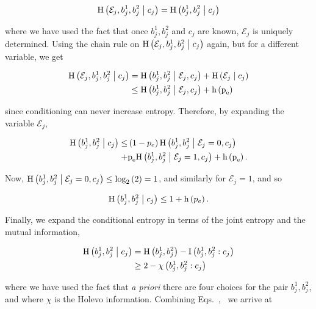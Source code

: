 \begin{equation*}
\text{H}\left(\mathcal{E}_j, b_j^1, b_j^2 \; \middle| \; c_j\right) = \text{H}\left(b_j^1, b_j^2 \; \middle| \; c_j\right)
\end{equation*}

\noindent where we have used the fact that once $b_j^1, b_j^2$ and $c_j$ are known, $\mathcal{E}_j$ is uniquely determined. Using the chain rule on $\text{H}\left(\mathcal{E}_j, b_j^1, b_j^2 \; \middle| \; c_j\right)$ again, but for a different variable, we get

\begin{align*}
\text{H}\left(\mathcal{E}_j, b_j^1, b_j^2 \; \middle| \; c_j\right) &= \text{H}\left(b_j^1, b_j^2 \; \middle| \; \mathcal{E}_j, c_j\right) + \text{H}\left(\mathcal{E}_j \; \middle| \; c_j\right) \notag \\
&\le \text{H}\left(b_j^1, b_j^2 \; \middle| \; \mathcal{E}_j, c_j\right) + \text{h}\left(\text{p}_{\text{e}}\right)
\end{align*}

\noindent since conditioning can never increase entropy. Therefore, by expanding the variable $\mathcal{E}_j$,

\begin{align*}
\text{H}\left(b_j^1, b_j^2 \; \middle| \; c_j\right) \le &\left(1 - p_e\right) \text{H}\left(b_j^1, b_j^2 \; \middle| \; \mathcal{E}_j = 0, c_j\right) \\ + &\text{p}_{\text{e}} \text{H}\left(b_j^1, b_j^2 \; \middle| \; \mathcal{E}_j=1, c_j\right) + \text{h}\left(\text{p}_{\text{e}}\right).
\end{align*}

\noindent Now, $\text{H}\left(b_j^1, b_j^2 \; \middle| \; \mathcal{E}_j=0, c_j\right) \le \log_2\left(2\right) = 1$, and similarly for $\mathcal{E}_j=1$, and so

\begin{equation}\label{eqn:A7}
\text{H}\left(b_j^1, b_j^2 \; \middle| \; c_j\right) \le 1 + \text{h}\left(p_e\right).
\end{equation}

\noindent Finally, we expand the conditional entropy in terms of the joint entropy and the mutual information,

\begin{align}\label{eqn:A8}
\text{H}\left(b_j^1, b_j^2 \; \middle| \; c_j\right) &= \text{H}\left(b_j^1, b_j^2\right) - \text{I}\left(b_j^1, b_j^2 : c_j\right) \notag \\
&\ge 2 - \chi\left(b_j^1, b_j^2 : c_j\right)
\end{align}

\noindent where we have used the fact that \emph{a priori} there are four choices for the pair $b_j^1, b_j^2$, and where $\chi$ is the Holevo information. Combining Eqs.~,~ we arrive at


